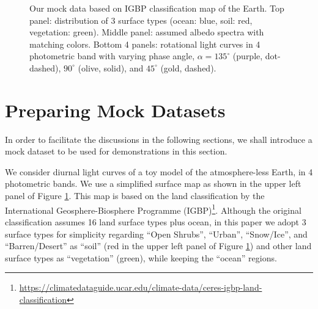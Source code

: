 \documentclass[iop,numberedappendix,apj,]{emulateapj}
\begin{document}
\begin{figure}[t]
\begin{center}
    \end{center}
    \caption{Our mock data based on IGBP classification map of the Earth. Top panel: distribution of 3 surface types (ocean: blue, soil: red, vegetation: green). Middle panel: assumed albedo spectra with matching colors. Bottom 4 panels: rotational light curves in 4 photometric band with varying phase angle, $\alpha = 135^{\circ }$ (purple, dot-dashed), $90^{\circ }$ (olive, solid), and $45^{\circ }$ (gold, dashed). }
\label{fig:mockdata}
\end{figure}


\section{Preparing Mock Datasets}
\label{s:mockdata}

In order to facilitate the discussions in the following sections, we shall introduce a mock dataset to be used for demonstrations in this section. 

We consider diurnal light curves of a toy model of the atmosphere-less Earth, in 4 photometric bands. 
We use a simplified surface map as shown in the upper left panel of Figure \ref{fig:mockdata}. 
This map is based on the land classification by the International Geosphere-Biosphere Programme (IGBP)\footnote{\url{https://climatedataguide.ucar.edu/climate-data/ceres-igbp-land-classification}}. 
Although the original classification assumes 16 land surface types plus ocean, in this paper we adopt 3 surface types for simplicity regarding ``Open Shrubs'', ``Urban'', ``Snow/Ice'', and ``Barren/Desert'' as ``soil'' (red in the upper left panel of Figure \ref{fig:mockdata}) and other land surface types as ``vegetation'' (green), while keeping the ``ocean'' regions. 
\end{document}
